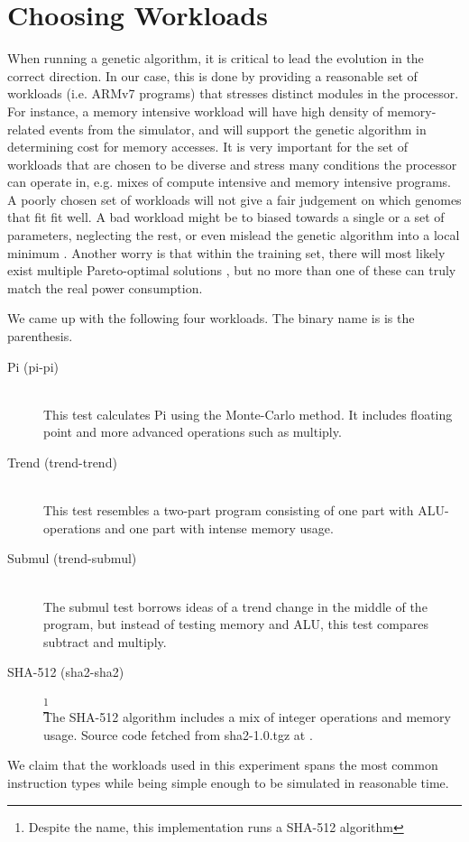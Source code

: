 \section{Choosing Workloads}

When running a genetic algorithm, it is critical to lead the evolution in the
correct direction. In our case, this is done by providing a reasonable set of
workloads (i.e. ARMv7 programs) that stresses distinct modules in the processor.
For instance, a memory intensive workload will have high density of
memory-related events from the simulator, and will support the genetic algorithm
in determining cost for memory accesses. It is very important for the set of
workloads that are chosen to be diverse and stress many conditions the processor
can operate in, e.g. mixes of compute intensive and memory intensive programs.
A poorly chosen set of workloads will not give a fair judgement on which genomes
that fit fit well. A bad workload might be to biased towards a single or a set
of parameters, neglecting the rest, or even mislead the genetic algorithm into a
local minimum \cite{introtoga}. Another worry is that within the training set,
there will most likely exist multiple Pareto-optimal solutions
\cite{deb2014multi}, but no more than one of these can truly match the real
power consumption.

We came up with the following four workloads. The binary name is is the
parenthesis.

\begin{description}
    \item[Pi (pi-pi)] \hfill \\
        This test calculates Pi using the Monte-Carlo method. It includes
        floating point and more advanced operations such as multiply.
    \item[Trend (trend-trend)] \hfill \\
        This test resembles a two-part program consisting of
        one part with ALU-operations and one part with intense memory usage.
    \item[Submul (trend-submul)] \hfill \\
        The submul test borrows ideas of a trend change in the middle of
        the program, but instead of testing memory and ALU, this test compares
        subtract and multiply.
    \item[SHA-512 (sha2-sha2)]
        \footnote{Despite the name, this implementation runs a SHA-512
        algorithm} \hfill \\
        The SHA-512 algorithm includes a mix of integer operations and
        memory usage. Source code fetched from sha2-1.0.tgz at \cite{sha2}.
\end{description}

We claim that the workloads used in this experiment spans the most common
instruction types while being simple enough to be simulated in reasonable time.

